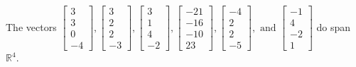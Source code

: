 \begin{exercise}
\begin{exerciseStatement}
  \end{exerciseStatement}
  \begin{exerciseAnswer}
   The vectors \(\left[\begin{array}{r}
3 \\
3 \\
0 \\
-4
\end{array}\right] , \left[\begin{array}{r}
3 \\
2 \\
2 \\
-3
\end{array}\right] , \left[\begin{array}{r}
3 \\
1 \\
4 \\
-2
\end{array}\right] , \left[\begin{array}{r}
-21 \\
-16 \\
-10 \\
23
\end{array}\right] , \left[\begin{array}{r}
-4 \\
2 \\
2 \\
-5
\end{array}\right] , \text{ and } \left[\begin{array}{r}
-1 \\
4 \\
-2 \\
1
\end{array}\right]\) 
  	 do  
	span \(\mathbb{R}^4\).
  


  \end{exerciseAnswer}
\end{exercise}